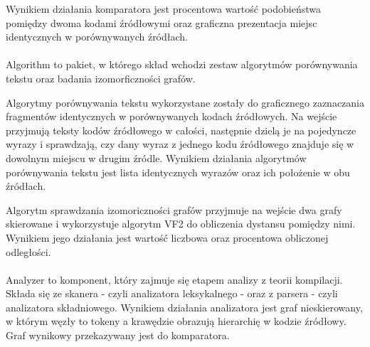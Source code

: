 \documentclass[a4paper,12pt]{article}
\begin{document}
Wynikiem działania komparatora jest procentowa wartość podobieństwa pomiędzy dwoma kodami źródłowymi oraz graficzna prezentacja miejsc identycznych w porównywanych źródłach.
\\ \\
Algorithm to pakiet, w którego skład wchodzi zestaw algorytmów porównywania tekstu oraz badania izomorficzności grafów. 

Algorytmy porównywania tekstu wykorzystane zostały do graficznego zaznaczania fragmentów identycznych w porównywanych kodach źródłowych. Na wejście przyjmują teksty kodów źródłowego w całości, następnie dzielą je na pojedyncze wyrazy i sprawdzają, czy dany wyraz z jednego kodu źródłowego znajduje się w dowolnym miejscu w drugim źródle. Wynikiem działania algorytmów porównywania tekstu jest lista identycznych wyrazów oraz ich położenie w obu źródłach.

Algorytm sprawdzania izomoriczności grafów przyjmuje na wejście dwa grafy skierowane i wykorzystuje algorytm VF2 do obliczenia dystansu pomiędzy nimi. Wynikiem jego działania jest wartość liczbowa oraz procentowa obliczonej odległości.
\\ \\
Analyzer to komponent, który zajmuje się etapem analizy z teorii kompilacji. Składa się ze skanera - czyli analizatora leksykalnego - oraz z parsera - czyli analizatora składniowego. Wynikiem działania analizatora jest graf nieskierowany, w którym węzły to tokeny a krawędzie obrazują hierarchię w kodzie źródłowy. Graf wynikowy przekazywany jest do komparatora.
\end{document}
